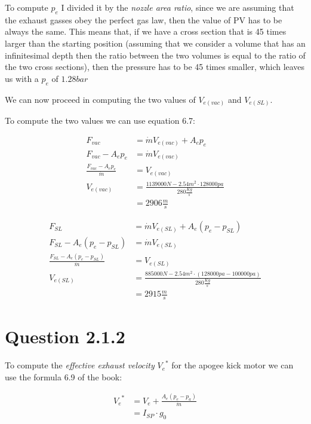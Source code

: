 \documentclass[9pt,a4paper]{scrreprt}
\begin{document}
      To compute $p_e$ I divided it by the \emph{nozzle area ratio}, since we are assuming that the exhaust
      gasses obey the perfect gas law, then the value of PV has to be always the same. This means that, if we have
      a cross section that is 45 times larger than the starting position (assuming that we consider a volume that has an
      infinitesimal depth then the ratio between the two volumes is equal to the ratio of the two cross sections), then 
      the pressure has to be 45 times smaller, which leaves us with a $p_e$ of $1.28 bar$

      We can now proceed in computing the two values of $V_{e(vac)}$ and $V_{e(SL)}$.

      To compute the two values we can use equation 6.7:

      \begin{align*}
        F_{vac} &= \dot{m} V_{e(vac)} + A_e p_e \\
        F_{vac} - A_e p_e &= \dot{m} V_{e(vac)} \\
        \frac{F_{vac} - A_e p_e}{\dot{m}} &= V_{e(vac)} \\
        V_{e(vac)} &= \frac{1139000N - 2.54 m^2 \cdot 128000pa}{280 \frac{Kg}{s}} \\
                   &= 2906 \frac{m}{s}
      \end{align*}

      \begin{align*}
        F_{SL} &= \dot{m} V_{e(SL)} + A_e (p_e - p_{SL}) \\
        F_{SL} - A_e (p_e - p_{SL}) &= \dot{m} V_{e(SL)} \\
        \frac{F_{SL} - A_e (p_e - p_{SL})}{\dot{m}} &= V_{e(SL)} \\
        V_{e(SL)} &= \frac{885000N - 2.54 m^2 \cdot (128000pa - 100000pa)}{280 \frac{Kg}{s}} \\
                  &= 2915 \frac{m}{s}
      \end{align*}

    \section*{Question 2.1.2}

      To compute the \emph{effective exhaust velocity} ${V_e}^*$ for the
       apogee kick motor we can use the formula 6.9 of
      the book:

      \begin{align*}
        {V_e}^* &= V_e + \frac{A_e (p_e - p_a)}{\dot{m}} \\
                &= I_{SP} \cdot g_0
      \end{align*}
\end{document}
